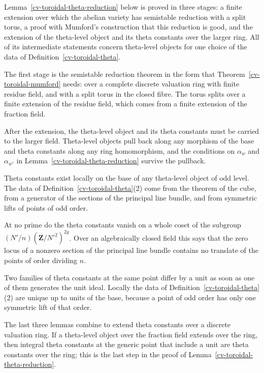 Lemma~\ref{cv-toroidal-theta-reduction} below is proved in three stages: a finite extension over which
the abelian variety has semistable reduction with a split torus, a proof with Mumford's construction
that this reduction is good, and the extension of the theta-level object and its theta constants over
the larger ring. All of its intermediate statements concern theta-level objects for one choice of the
data of Definition~\ref{cv-toroidal-theta}.

The first stage is the semistable reduction theorem in the form that Theorem~\ref{cv-toroidal-mumford}
needs: over a complete discrete valuation ring with finite residue field, and with a split torus in the
closed fibre. The torus splits over a finite extension of the residue field, which comes from a finite
extension of the fraction field.

After the extension, the theta-level object and its theta constants must be carried to the larger
field. Theta-level objects pull back along any morphism of the base and theta constants along any ring
homomorphism, and the conditions on $\alpha_w$ and $\alpha_{w'}$ in
Lemma~\ref{cv-toroidal-theta-reduction} survive the pullback.

Theta constants exist locally on the base of any theta-level object of odd level. The data of
Definition~\ref{cv-toroidal-theta}(2) come from the theorem of the cube, from a generator of the
sections of the principal line bundle, and from symmetric lifts of points of odd order.

At no prime do the theta constants vanish on a whole coset of the subgroup
$(N'/n)(\mathbf Z/N'^2)^{2g}$. Over an algebraically closed field this says that the zero locus of a
nonzero section of the principal line bundle contains no translate of the points of order dividing $n$.

Two families of theta constants at the same point differ by a unit as soon as one of them generates the
unit ideal. Locally the data of Definition~\ref{cv-toroidal-theta}(2) are unique up to units of the
base, because a point of odd order has only one symmetric lift of that order.

The last three lemmas combine to extend theta constants over a discrete valuation ring. If a
theta-level object over the fraction field extends over the ring, then integral theta constants at the
generic point that include a unit are theta constants over the ring; this is the last step in the proof
of Lemma~\ref{cv-toroidal-theta-reduction}.

